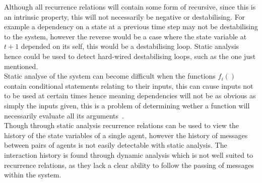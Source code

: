 \documentclass{article}
\begin{document}
Although all recurrence relations will contain some form of recursive, since this is an intrinsic property, this will not necessarily be negative or destabilising. For example a dependency on a state at a previous time step may not be destabilising to the system, however the reverse would be a case where the state variable at $t+1$ depended on its self, this would be a destabilising loop. Static analysis hence could be used to detect hard-wired destabilising loops, such as the one just mentioned.\\
Static analyse of the system can become difficult when the functions $f_{i}()$ contain conditional statements relating to their inputs, this can cause inputs not to be used at certain times hence meaning dependencies will not be as obvious as simply the inputs given, this is a problem of determining wether a function will necessarily evaluate all its arguments~\cite{willevaluteargsa}.\\
Though through static analysis recurrence relations can be used to view the history of the state variables of a single agent, however the history of messages between pairs of agents is not easily detectable with static analysis. The interaction history is found through dynamic analysis which is not well suited to recurrence relations, as they lack a clear ability to follow the passing of messages within the system.   
\end{document}
